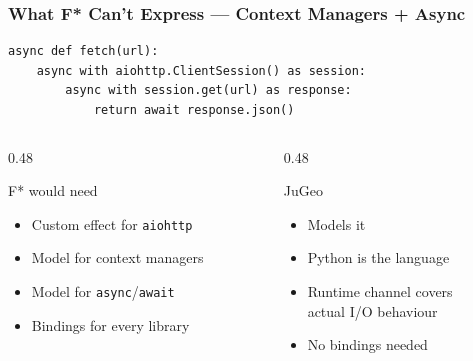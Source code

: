 \begin{frame}[fragile]
\frametitle{What F* Can't Express --- Context Managers + Async}
\begin{lstlisting}
async def fetch(url):
    async with aiohttp.ClientSession() as session:
        async with session.get(url) as response:
            return await response.json()
\end{lstlisting}
\vfill
\begin{columns}[T]
\begin{column}{0.48\textwidth}
\begin{alertblock}{F* would need}
\begin{itemize}
  \item Custom effect for \texttt{aiohttp}
  \item Model for context managers
  \item Model for \texttt{async}/\texttt{await}
  \item Bindings for every library
\end{itemize}
\end{alertblock}
\end{column}
\begin{column}{0.48\textwidth}
\begin{exampleblock}{JuGeo}
\begin{itemize}
  \item Models it 
  \item Python is the language
  \item Runtime channel covers\\actual I/O behaviour
  \item No bindings needed
\end{itemize}
\end{exampleblock}
\end{column}
\end{columns}
\end{frame}

